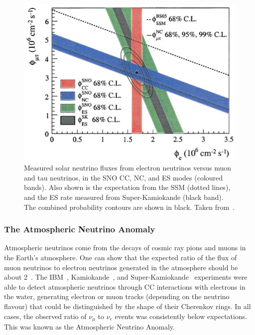 \begin{figure}
    \centering
    \includegraphics[width=\textwidth]{1_NeutrinoTheory/Figs/sno_vs_ssm_comparison.png}
    \caption[Comparison of measured solar neutrino fluxes in the SNO CC, NC, and ES modes to the SSM]
    {Measured solar neutrino fluxes from electron neutrinos versus muon and tau neutrinos, in the SNO CC, NC, and ES modes (coloured bands). Also shown is the expectation from the SSM (dotted lines), and the ES rate measured from Super-Kamiokande (black band). The combined probability contours are shown in black. Taken from~\cite{aharmimElectronEnergySpectra2005}.}
    \label{fig:sno_flux_results}
\end{figure}


\subsubsection{The Atmospheric Neutrino Anomaly}
Atmospheric neutrinos come from the decays of cosmic ray pions and muons in the Earth's atmosphere. One can show that the expected ratio of the flux of muon neutrinos to electron neutrinos generated in the atmosphere should be about 2~\cite{}. %
The IBM~\cite{}, %
Kamiokande~\cite{}, %
and Super-Kamiokande~\cite{} %
experiments were able to detect atmospheric neutrinos through CC interactions with electrons in the water, generating electron or muon tracks (depending on the neutrino flavour) that could be distinguished by the shape of their Cherenkov rings. In all cases, the observed ratio of $\nu_{\mu}$ to $\nu_{e}$ events was consistently below expectations. This was known as the Atmospheric Neutrino Anomaly.

